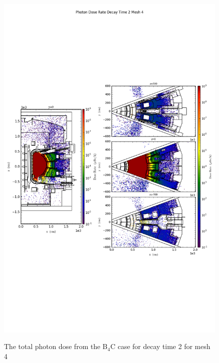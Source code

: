 \begin{figure}[ht!]
\centering
\includegraphics[trim={0cm 9cm 0cm 10cm},clip,scale=0.75]{../plots/final_model_with_b4c/Photon_Dose_Rate_Decay_Time_2_Mesh_4.png}
\label{fig:photons_dc2_no4bc_m4_flux}
\caption{The total photon dose from the B$_4$C case for decay time 2 for mesh 4}
\end{figure}
